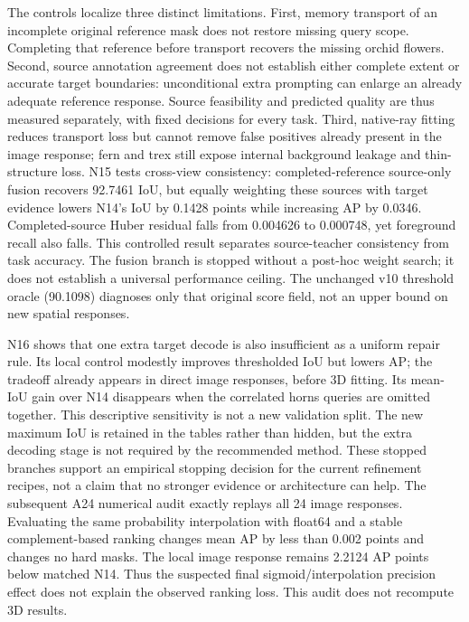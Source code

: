 The controls localize three distinct limitations. First, memory transport of
an incomplete original reference mask does not restore missing query scope.
Completing that reference before transport recovers the missing orchid flowers.
Second, source annotation agreement does not establish either complete extent
or accurate target boundaries: unconditional extra prompting can enlarge an
already adequate reference response. Source feasibility and predicted quality
are thus measured separately, with fixed decisions for every task. Third,
native-ray fitting reduces transport loss but cannot remove false positives
already present in the image response; fern and trex still expose internal
background leakage and thin-structure loss. N15 tests cross-view consistency:
completed-reference source-only fusion recovers 92.7461 IoU, but equally
weighting these sources with target evidence lowers N14's IoU by 0.1428 points
while increasing AP by 0.0346. Completed-source Huber residual falls from
0.004626 to 0.000748, yet foreground recall also falls. This controlled result
separates source-teacher consistency from task accuracy. The fusion branch is
stopped without a post-hoc weight search; it does not establish a universal
performance ceiling. The unchanged v10 threshold oracle (90.1098) diagnoses only that
original score field, not an upper bound on new spatial responses.

N16 shows that one extra target decode is also insufficient as a uniform
repair rule. Its local control modestly improves thresholded IoU but lowers AP;
the tradeoff already appears in direct image responses, before 3D fitting.
Its mean-IoU gain over N14 disappears when the correlated horns queries are
omitted together. This descriptive sensitivity is not a new validation split.
The new maximum IoU is retained in the tables rather than hidden, but the
extra decoding stage is not required by the recommended method. These stopped
branches support an empirical stopping decision for the current refinement
recipes, not a claim that no stronger evidence or architecture can help.
The subsequent A24 numerical audit exactly replays all 24 image responses.
Evaluating the same probability interpolation with float64 and a stable
complement-based ranking changes mean AP by less than 0.002 points and changes
no hard masks. The local image response remains 2.2124 AP points below matched
N14. Thus the suspected final sigmoid/interpolation precision effect does not
explain the observed ranking loss. This audit does not recompute 3D results.

